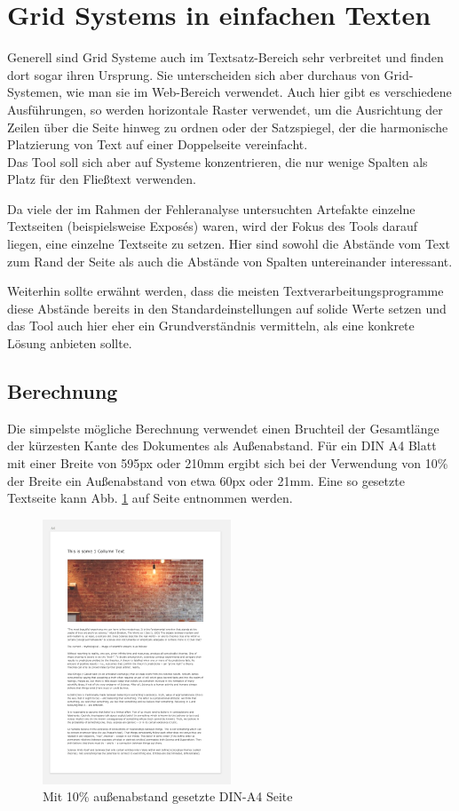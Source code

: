 \section{Grid Systems in einfachen Texten}
Generell sind Grid Systeme auch im Textsatz-Bereich sehr verbreitet und finden dort sogar ihren Ursprung. Sie unterscheiden sich aber durchaus von Grid-Systemen, wie man sie im Web-Bereich verwendet. Auch hier gibt es verschiedene Ausführungen, so werden horizontale Raster verwendet, um die Ausrichtung der Zeilen über die Seite hinweg zu ordnen oder der Satzspiegel, der die harmonische Platzierung von Text auf einer Doppelseite vereinfacht. \\
Das Tool soll sich aber auf Systeme konzentrieren, die nur wenige Spalten als Platz für den Fließtext verwenden.

Da viele der im Rahmen der Fehleranalyse untersuchten Artefakte einzelne Textseiten (beispielsweise Exposés) waren, wird der Fokus des Tools darauf liegen, eine einzelne Textseite zu setzen.
Hier sind sowohl die Abstände vom Text zum Rand der Seite als auch die Abstände von Spalten untereinander interessant.

Weiterhin sollte erwähnt werden, dass die meisten Textverarbeitungsprogramme diese Abstände bereits in den Standardeinstellungen auf solide Werte setzen und das Tool auch hier eher ein Grundverständnis vermitteln, als eine konkrete Lösung anbieten sollte.

\subsection{Berechnung}
Die simpelste mögliche Berechnung verwendet einen Bruchteil der Gesamtlänge der kürzesten Kante des Dokumentes als Außenabstand. Für ein DIN A4 Blatt mit einer Breite von 595px oder 210mm ergibt sich bei der Verwendung von 10\% der Breite ein Außenabstand von etwa 60px oder 21mm.
Eine so gesetzte Textseite kann Abb. \ref{fig:a4-single-col} auf Seite \pageref{fig:a4-single-col} entnommen werden.

\begin{figure}[h]
    \centering
    \includegraphics[width=0.5\textwidth]{images/A4-single-col.png}
    \caption{Mit 10\% außenabstand gesetzte DIN-A4 Seite}
    \label{fig:a4-single-col}
\end{figure}

